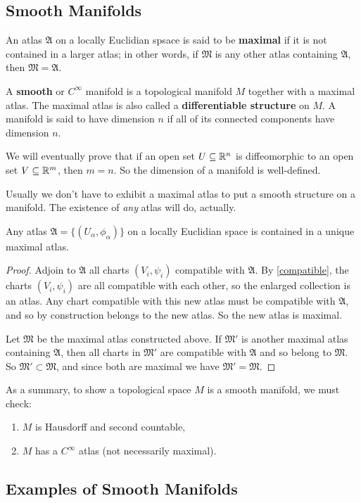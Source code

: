 \subsection{Smooth Manifolds}
An atlas $\mathfrak A$ on a locally Euclidian spsace is said to be \textbf{maximal} if it is not contained in a larger atlas; in other words, if $\mathfrak M$ is any other atlas containing $\mathfrak A$, then $\mathfrak M=\mathfrak A$.
\begin{definition}[]
    A \textbf{smooth} or $C^{\infty}$ manifold is a topological manifold $M$ together with a maximal atlas. The maximal atlas is also called a \textbf{differentiable structure} on $M$. A manifold is said to have dimension $n$ if all of its connected components have dimension $n$.
\end{definition}
We will eventually prove that if an open set $U\subseteq \mathbb{R}^n $ is diffeomorphic to an open set $V \subseteq \mathbb{R}^m$, then $m=n$. So the dimension of a manifold is well-defined.

Usually we don't have to exhibit a maximal atlas to put a smooth structure on a manifold. The existence of \emph{any} atlas will do, actually.
\begin{prop}
    Any atlas $\mathfrak A= \{(U_{\alpha }, \phi_{\alpha })\} $ on a locally Euclidian space is contained in a unique maximal atlas.
\end{prop}
\begin{proof}
    Adjoin to $\mathfrak A$ all charts $(V_i ,\psi _i )$ compatible with $\mathfrak A$. By \cref{compatible}, the charts $(V_i ,\psi _i )$ are all compatible with each other, so the enlarged collection is an atlas. Any chart compatible with this new atlas must be compatible with $\mathfrak A$, and so by construction belongs to the new atlas. So the new atlas is maximal.

    Let $\mathfrak M$ be the maximal atlas constructed above. If $\mathfrak M'$ is another maximal atlas containing $\mathfrak A$, then all charts in $\mathfrak M'$ are compatible with $\mathfrak A$ and so belong to $\mathfrak M$. So $\mathfrak M' \subset \mathfrak M$, and since both are maximal we have $\mathfrak M'=\mathfrak M$.
\end{proof}
As a summary, to show a topological space $M$ is a smooth manifold, we must check:
\begin{enumerate}[label=(\roman*)]
    \item $M$ is Hausdorff and second countable,
    \item $M$ has a $C^{\infty}$ atlas (not necessarily maximal).
\end{enumerate}
\subsection{Examples of Smooth Manifolds}

